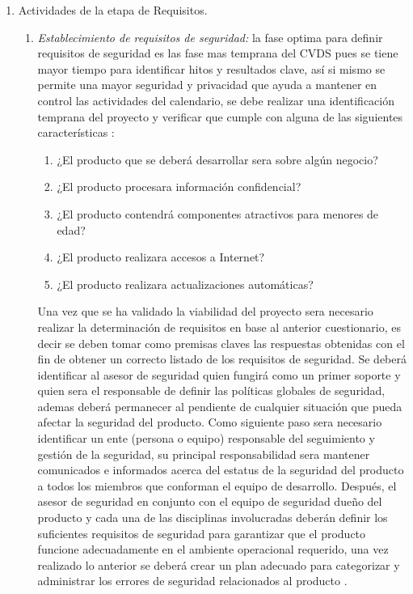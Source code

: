 \documentclass[runningheads,a4paper]{llncs}
\begin{document}
\begin{enumerate}
\item Actividades de la etapa de Requisitos.
\\
\begin{enumerate}
\item \textit{Establecimiento de requisitos de seguridad: }la fase optima para definir requisitos de seguridad es las fase mas temprana del \gls{CVDS} pues se tiene mayor tiempo para identificar hitos y resultados clave, así si mismo se permite una mayor seguridad y privacidad que ayuda a mantener en control las actividades del calendario, se debe realizar una identificación temprana del proyecto y verificar que cumple con alguna de las siguientes características \cite{SDLWhitePaper}:
\\
\begin{enumerate}
	\item ¿El producto que se deberá desarrollar sera sobre algún negocio? 
	\item ¿El producto procesara información confidencial?
	\item ¿El producto contendrá componentes atractivos para menores de edad?
	\item ¿El producto realizara accesos a Internet?
	\item ¿El producto realizara actualizaciones automáticas?\\
	
\end{enumerate}    
Una vez que se ha validado la viabilidad del proyecto sera necesario realizar la determinación de requisitos en base al anterior cuestionario, es decir se deben tomar como premisas claves las respuestas obtenidas con el fin de obtener un correcto listado de los requisitos de seguridad. Se deberá identificar al asesor de seguridad quien fungirá como un primer soporte y quien sera el responsable de definir las políticas globales de seguridad, ademas deberá permanecer al pendiente de cualquier situación que pueda afectar la seguridad del producto. Como siguiente paso sera necesario identificar un ente (persona o equipo) responsable del seguimiento y gestión de la seguridad, su principal responsabilidad sera mantener comunicados e informados acerca del estatus de la seguridad del producto a todos los miembros que conforman el equipo de desarrollo. Después, el asesor de seguridad en conjunto con el equipo de seguridad dueño del producto y cada una de las disciplinas involucradas deberán definir los suficientes requisitos de seguridad para garantizar que el producto funcione adecuadamente en el ambiente operacional requerido, una vez realizado lo anterior se deberá crear un plan adecuado para categorizar y administrar los errores de seguridad relacionados al producto \cite{SDLWhitePaper}. \\


\end{enumerate}
\end{enumerate}
\end{document}
